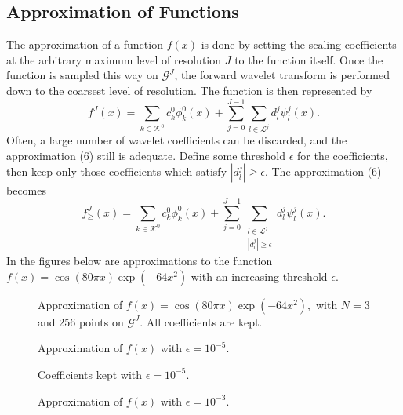 \documentclass[11pt]{article}
\begin{document}
\subsection{Approximation of Functions}
The approximation of a function $f(x)$ is done by setting the scaling coefficients at the arbitrary maximum level of resolution $J$ to the function itself. Once the function is sampled this way on $\mathcal{G}^J$, the forward wavelet transform is 
performed down to the coarsest level of resolution. The function is then represented by 
\begin{equation}
        f^J(x)=\sum_{k \in \mathcal{K}^0} c_{k}^{0} \phi_{k}^{0}(x) + \sum_{j=0}^{J-1} \sum_{l \in \mathcal{L}^j}
                d_{l}^{j} \psi_{l}^{j}(x).
\end{equation}
Often, a large number of wavelet coefficients can be discarded, and the approximation (6) still is adequate. Define some threshold $\epsilon$ for the coefficients, then keep only those coefficients which satisfy $|d_{l}^{j}| \geq \epsilon$. The approximation (6) becomes 
\begin{equation}
        f_{\geq}^{J}(x)=\sum_{k \in \mathcal{K}^0} c_{k}^{0} \phi_{k}^{0}(x) + \sum_{j=0}^{J-1} \sum_{ \substack{ l \in \mathcal{L}^j \\ |d_{l}^{j}| \geq \epsilon} } d_{l}^{j} \psi_{l}^{j}(x).
\end{equation}
In the figures below are approximations to the function $f(x)=\cos{(80 \pi x)} \exp{(-64 x^2)}$ with an increasing threshold 
$\epsilon$.
\begin{figure}[H]
	\center
	
	\caption{Approximation of $f(x)=\cos{(80 \pi x)} \exp{(-64 x^2)},$ with $N=3$ and 256 points on $\mathcal{G}^J$. All coefficients are kept.}
\end{figure}

\begin{figure}[H]
	\center
	
	\caption{Approximation of $f(x)$ with $\epsilon=10^{-5}$.}
\end{figure}

\begin{figure}[H]
	\center
	
	\caption{Coefficients kept with $\epsilon=10^{-5}$.}
\end{figure}

\begin{figure}[H]
	\center
	
	\caption{Approximation of $f(x)$ with $\epsilon=10^{-3}$.}
\end{figure}
\end{document}
